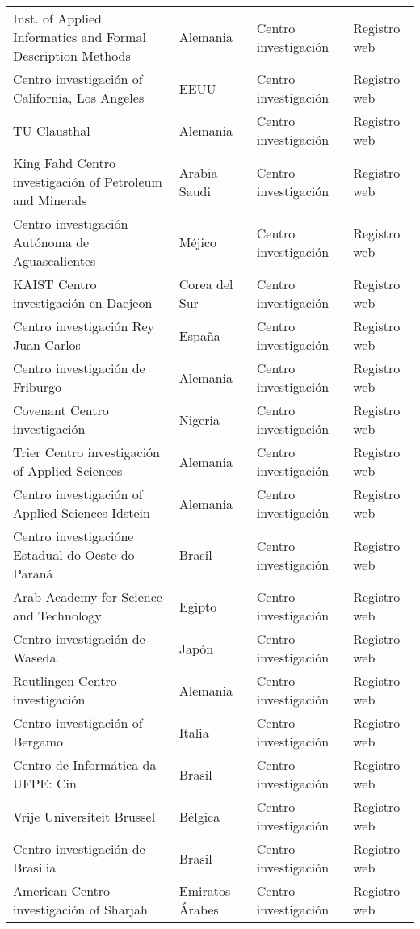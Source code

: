 \begin{table}[htbp]
\begin{tabular}{llll}
    Inst. of Applied Informatics and Formal Description Methods & Alemania & Centro investigación & Registro web \\
    Centro investigación of California, Los Angeles & EEUU  & Centro investigación & Registro web \\
    TU Clausthal & Alemania & Centro investigación & Registro web \\
    King Fahd Centro investigación of Petroleum and Minerals & Arabia Saudi & Centro investigación & Registro web \\
    Centro investigación Autónoma de Aguascalientes & Méjico & Centro investigación & Registro web \\
    KAIST Centro investigación en Daejeon & Corea del Sur & Centro investigación & Registro web \\
    Centro investigación Rey Juan Carlos & España & Centro investigación & Registro web \\
    Centro investigación de Friburgo & Alemania & Centro investigación & Registro web \\
    Covenant Centro investigación & Nigeria & Centro investigación & Registro web \\
    Trier Centro investigación of Applied Sciences & Alemania & Centro investigación & Registro web \\
    Centro investigación of Applied Sciences Idstein & Alemania & Centro investigación & Registro web \\
    Centro investigacióne Estadual do Oeste do Paraná & Brasil & Centro investigación & Registro web \\
    Arab Academy for Science and Technology & Egipto & Centro investigación & Registro web \\
    Centro investigación de Waseda & Japón & Centro investigación & Registro web \\
    Reutlingen Centro investigación & Alemania & Centro investigación & Registro web \\
    Centro investigación of Bergamo & Italia & Centro investigación & Registro web \\
    Centro de Informática da UFPE: Cin & Brasil & Centro investigación & Registro web \\
    Vrije Universiteit Brussel & Bélgica & Centro investigación & Registro web \\
    Centro investigación de Brasilia & Brasil & Centro investigación & Registro web \\
    American Centro investigación of Sharjah & Emiratos Árabes & Centro investigación & Registro web \\

\end{tabular}
\end{table}
